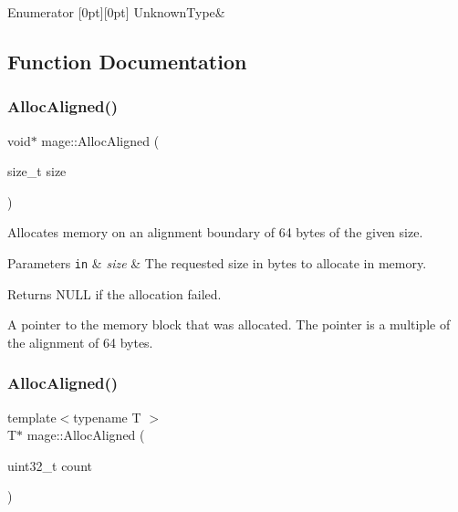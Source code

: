 \begin{DoxyEnumFields}{Enumerator}
[0pt][0pt]{}\hypertarget{namespacemage_a530428e73bac0ba7fe84b29086a9e33aa6e4917f41203f9eb5a3fbab1b4719712}{}\label{namespacemage_a530428e73bac0ba7fe84b29086a9e33aa6e4917f41203f9eb5a3fbab1b4719712} 
Unknown\+Type&\\
\hline

\end{DoxyEnumFields}


\subsection{Function Documentation}
\hypertarget{namespacemage_a7d706913bb9fb322c938cd3e4d8eaede}{}\label{namespacemage_a7d706913bb9fb322c938cd3e4d8eaede} 
\subsubsection{\texorpdfstring{Alloc\+Aligned()}{AllocAligned()}\hspace{0.1cm}{\footnotesize\ttfamily [1/2]}}
{\footnotesize\ttfamily void$\ast$ mage\+::\+Alloc\+Aligned (\begin{DoxyParamCaption}\item[{size\+\_\+t}]{size }\end{DoxyParamCaption})}

Allocates memory on an alignment boundary of 64 bytes of the given size.


\begin{DoxyParams}[1]{Parameters}
\mbox{\tt in}  & {\em size} & The requested size in bytes to allocate in memory. \\
\hline
\end{DoxyParams}
\begin{DoxyReturn}{Returns}
{\ttfamily N\+U\+LL} if the allocation failed. 

A pointer to the memory block that was allocated. The pointer is a multiple of the alignment of 64 bytes. 
\end{DoxyReturn}
\hypertarget{namespacemage_ae2f31ba64620694aa0dfc8ca6e5d5941}{}\label{namespacemage_ae2f31ba64620694aa0dfc8ca6e5d5941} 
\subsubsection{\texorpdfstring{Alloc\+Aligned()}{AllocAligned()}\hspace{0.1cm}{\footnotesize\ttfamily [2/2]}}
{\footnotesize\ttfamily template$<$typename T $>$ \\
T$\ast$ mage\+::\+Alloc\+Aligned (\begin{DoxyParamCaption}\item[{uint32\+\_\+t}]{count }\end{DoxyParamCaption})}

